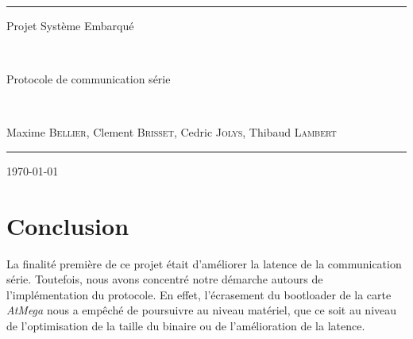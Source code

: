 \documentclass[a4paper,10pt]{article}
\begin{document}
\noindent{}
\rule{\textwidth}{1pt}
\begin{flushright}
  {\Huge Projet Système Embarqué}

~

  {\Large Protocole de communication série}

~

  {\large  Maxime \textsc{Bellier}, Clement \textsc{Brisset}, Cedric \textsc{Jolys}, Thibaud \textsc{Lambert} }
\end{flushright}
\rule{\textwidth}{1pt}
\thispagestyle{empty}
\begin{flushright} \today \end{flushright}

\newpage

\tableofcontents

\newpage








\section{Conclusion}

La finalité première de ce projet était d'améliorer la latence de la communication série. Toutefois, nous avons concentré notre démarche autours de l'implémentation du protocole. En effet, l'écrasement du bootloader de la carte \emph{AtMega} nous a empêché de poursuivre au niveau matériel, que ce soit au niveau de l'optimisation de la taille du binaire ou de l'amélioration de la latence.
\end{document}

